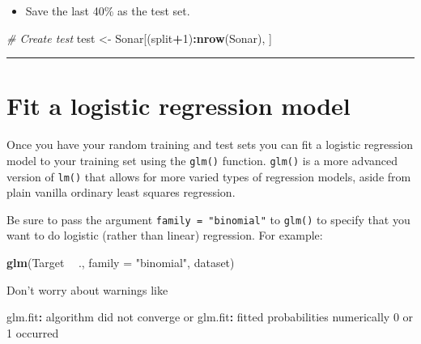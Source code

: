 \documentclass[
]{book}
\newenvironment{Shaded}{\begin{snugshade}}{\end{snugshade}}
\newcommand{\CommentTok}[1]{\textcolor[rgb]{0.56,0.35,0.01}{\textit{#1}}}
\newcommand{\DataTypeTok}[1]{\textcolor[rgb]{0.13,0.29,0.53}{#1}}
\newcommand{\DecValTok}[1]{\textcolor[rgb]{0.00,0.00,0.81}{#1}}
\newcommand{\KeywordTok}[1]{\textcolor[rgb]{0.13,0.29,0.53}{\textbf{#1}}}
\newcommand{\NormalTok}[1]{#1}
\newcommand{\OperatorTok}[1]{\textcolor[rgb]{0.81,0.36,0.00}{\textbf{#1}}}
\newcommand{\StringTok}[1]{\textcolor[rgb]{0.31,0.60,0.02}{#1}}
\providecommand{\tightlist}{%
  \setlength{\itemsep}{0pt}\setlength{\parskip}{0pt}}
\begin{document}
\begin{itemize}
\tightlist
\item
  Save the last 40\% as the test set.
\end{itemize}

\begin{Shaded}
\begin{Highlighting}[]
\CommentTok{# Create test}
\NormalTok{test <-}\StringTok{ }\NormalTok{Sonar[(split}\OperatorTok{+}\DecValTok{1}\NormalTok{)}\OperatorTok{:}\KeywordTok{nrow}\NormalTok{(Sonar), ]}
\end{Highlighting}
\end{Shaded}

\begin{center}\rule{0.5\linewidth}{0.5pt}\end{center}

\hypertarget{fit-a-logistic-regression-model}{%
\section{Fit a logistic regression model}\label{fit-a-logistic-regression-model}}

Once you have your random training and test sets you can fit a logistic regression model to your training set using the \texttt{glm()} function. \texttt{glm()} is a more advanced version of \texttt{lm()} that allows for more varied types of regression models, aside from plain vanilla ordinary least squares regression.

Be sure to pass the argument \texttt{family\ =\ "binomial"} to \texttt{glm()} to specify that you want to do logistic (rather than linear) regression. For example:

\begin{Shaded}
\begin{Highlighting}[]
\KeywordTok{glm}\NormalTok{(Target }\OperatorTok{~}\StringTok{ }\NormalTok{., }\DataTypeTok{family =} \StringTok{"binomial"}\NormalTok{, dataset)}
\end{Highlighting}
\end{Shaded}

Don't worry about warnings like

\begin{Shaded}
\begin{Highlighting}[]
\NormalTok{glm.fit}\OperatorTok{:}\StringTok{ }\NormalTok{algorithm did not converge or glm.fit}\OperatorTok{:}\StringTok{ }\NormalTok{fitted probabilities numerically }\DecValTok{0}\NormalTok{ or }\DecValTok{1}\NormalTok{ occurred}
\end{Highlighting}
\end{Shaded}
\end{document}
